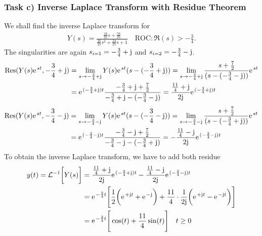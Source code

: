 \documentclass[11pt,a4paper,DIV=12]{scrartcl}
\begin{document}
\subsubsection{Task c) Inverse Laplace Transform with Residue Theorem}
We shall find the inverse Laplace transform for
\begin{align}
	Y(s) = \frac{\frac{16}{25}s+\frac{56}{25}}{\frac{16}{25}s^2+\frac{24}{25}s+1}
\quad \text{ROC}: \Re(s) > -\frac{3}{4}
	.
\end{align}
The singularities are again $s_{i=1}=-\frac{3}{4}+\im$ and $s_{i=2}=-\frac{3}{4}-\im$.
\begin{align}
	\mathrm{Res}(Y(s)\e^{st},-\frac{3}{4}+\im)&=\lim\limits_{s\rightarrow-\frac{3}{4}+\im}Y(s)\e^{st}(s-(-\frac{3}{4}+\im))=\lim\limits_{s\rightarrow-\frac{3}{4}+\im}\frac{s+\frac{7}{2}}{(s-(-\frac{3}{4}-\im))}\e^{st}\nonumber \\
	&=\e^{(-\frac{3}{4}+\im)t}\frac{-\frac{3}{4}+\im+\frac{7}{2}}{-\frac{3}{4}+\im-(-\frac{3}{4}-\im)}=\frac{\frac{11}{4}+\im}{2\im}\e^{(-\frac{3}{4}+\im)t}
\end{align}
\begin{align}
	\mathrm{Res}(Y(s)\e^{st},-\frac{3}{4}-\im)&=\lim\limits_{s\rightarrow-\frac{3}{4}-\im}Y(s)\e^{st}(s-(-\frac{3}{4}-\im))=\lim\limits_{s\rightarrow-\frac{3}{4}-\im}\frac{s+\frac{7}{2}}{(s-(-\frac{3}{4}+\im))}\e^{st}\nonumber \\
	&=\e^{(-\frac{3}{4}-\im)t}\frac{-\frac{3}{4}-\im+\frac{7}{2}}{-\frac{3}{4}-\im-(-\frac{3}{4}+\im)}=-\frac{\frac{11}{4}-\im}{2\im}\e^{(-\frac{3}{4}-\im)t}
\end{align}
To obtain the inverse Laplace transform, we have to add both residue
\begin{align}
	y(t)=\mathcal{L}^{-1}\bigg [Y(s)\bigg]&=\frac{\frac{11}{4}+\im}{2\im}\e^{(-\frac{3}{4}+\im)t}-\frac{\frac{11}{4}-\im}{2\im}\e^{(-\frac{3}{4}-\im)t}\nonumber \\
	&=\e^{-\frac{3}{4}t}\Bigg [\frac{1}{2}\bigg (\e^{+\im t}+\e^{-\im} \bigg )+\frac{11}{4}\cdot\frac{1}{2\im}\bigg (\e^{+\im t}-\e^{-\im t} \bigg )\Bigg ]\nonumber \\
	&= \e^{-\frac{3}{4}t}\Bigg [\cos(t)+\frac{11}{4}\sin(t)\Bigg ] \quad t \geq 0
\end{align}
\end{document}
